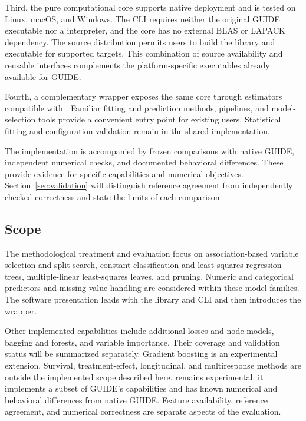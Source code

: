 \documentclass[article]{jss}
\begin{document}
Third, the pure  computational core supports native deployment
and is tested on Linux, macOS, and Windows. The CLI requires neither the
original GUIDE executable nor a  interpreter, and the core
has no external BLAS or LAPACK dependency. The source distribution permits
users to build the library and executable for supported targets. This
combination of source availability and reusable interfaces complements the
platform-specific executables already available for GUIDE.

Fourth, a complementary  wrapper exposes the same core
through estimators compatible with 
\citep{Pedregosa+etal:2011}. Familiar fitting and prediction methods,
pipelines, and model-selection tools provide a convenient entry point for
existing  users. Statistical fitting and configuration
validation remain in the shared  implementation.

The implementation is accompanied by frozen comparisons with native GUIDE,
independent numerical checks, and documented behavioral differences.
These provide evidence for specific capabilities and numerical objectives.
Section~\ref{sec:validation} will distinguish reference agreement from
independently checked correctness and state the limits of each comparison.

\subsection{Scope}\label{sec:scope}

The methodological treatment and evaluation focus on association-based
variable selection and split search, constant classification and
least-squares regression trees, multiple-linear least-squares leaves, and
pruning. Numeric and categorical predictors and missing-value handling are
considered within these model families. The software presentation leads
with the  library and CLI and then introduces the
 wrapper.

Other implemented capabilities include additional losses and node models,
bagging and forests, and variable importance. Their coverage and validation
status will be summarized separately. Gradient boosting is an experimental
 extension. Survival, treatment-effect, longitudinal, and
multiresponse methods are outside the implemented scope described here.
 remains experimental: it implements a subset of GUIDE's
capabilities and has known numerical and behavioral differences from native
GUIDE. Feature availability, reference agreement, and numerical correctness
are separate aspects of the evaluation.
\end{document}
